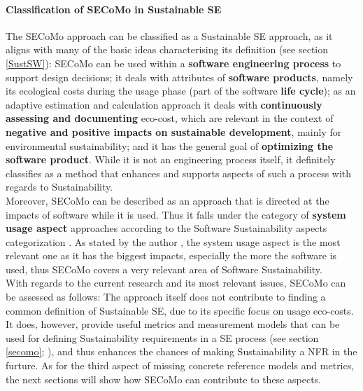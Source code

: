 \documentclass[oribibl]{llncs}
\begin{document}
\paragraph{Classification of SECoMo in Sustainable SE}
The SECoMo approach can be classified as a Sustainable SE approach, as it aligns with many of the basic ideas characterising its definition (see section \ref{SustSW}): SECoMo can be used within a \textbf{software engineering process} to support design decisions; it deals with attributes of \textbf{software products}, namely its ecological costs during the usage phase (part of the software \textbf{life cycle}); as an adaptive estimation and calculation approach it deals with \textbf{continuously assessing and documenting} eco-cost, which are relevant in the context of \textbf{negative and positive impacts on sustainable development}, mainly for environmental sustainability; and it has the general goal of \textbf{optimizing the software product}. While it is not an engineering process itself, it definitely classifies as a method that enhances and supports aspects of such a process with regards to Sustainability.\\
Moreover, SECoMo can be described as an approach that is directed at the impacts of software while it is used. Thus it falls under the category of \textbf{system usage aspect} approaches according to the Software Sustainability aspects categorization \cite{penzenstadler_supporting_2012}. %
As stated by the author \cite{penzenstadler_what_13}, the system usage aspect is the most relevant one as it has the biggest impacts, especially the more the software is used, thus SECoMo covers a very relevant area of Software Sustainability.\\
With regards to the current research and its most relevant issues, SECoMo can be assessed as follows: The approach itself does not contribute to finding a common definition of Sustainable SE, due to its specific focus on usage eco-costs. It does, however, provide useful metrics and measurement models that can be used for defining Sustainability requirements in a SE process (see section \ref{secomo}; \cite{schulze_cost_2016}), and thus enhances the chances of making Sustainability a NFR in the furture. As for the third aspect of missing concrete reference models and metrics, the next sections will show how SECoMo can contribute to these aspects. 
\end{document}
